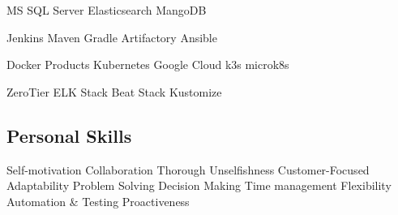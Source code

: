 \documentclass[]{openfont}
\begin{document}
\begin{minipage}[t]{0.33\textwidth}
\textbullet{}MS SQL Server 
\textbullet{}Elasticsearch
\textbullet{}MangoDB

\textbullet{}Jenkins 
\textbullet{}Maven
\textbullet{}Gradle
\textbullet{}Artifactory
\textbullet{}Ansible

\textbullet{}Docker Products 
\textbullet{}Kubernetes
\textbullet{}Google Cloud
\textbullet{}k3s
\textbullet{}microk8s

\textbullet{}ZeroTier
\textbullet{}ELK Stack 
\textbullet{}Beat Stack
\textbullet{}Kustomize

\sectionsep

\subsection{Personal Skills}

\textbullet{}Self-motivation 
\textbullet{}Collaboration 
\textbullet{}Thorough
\textbullet{}Unselfishness
\textbullet{}Customer-Focused
\textbullet{}Adaptability 
\textbullet{}Problem Solving 
\textbullet{}Decision Making 
\textbullet{}Time management
\textbullet{}Flexibility
\textbullet{}Automation \& Testing
\textbullet{}Proactiveness

\sectionsep

%
%

\end{minipage} 
\hfill
\end{document}
